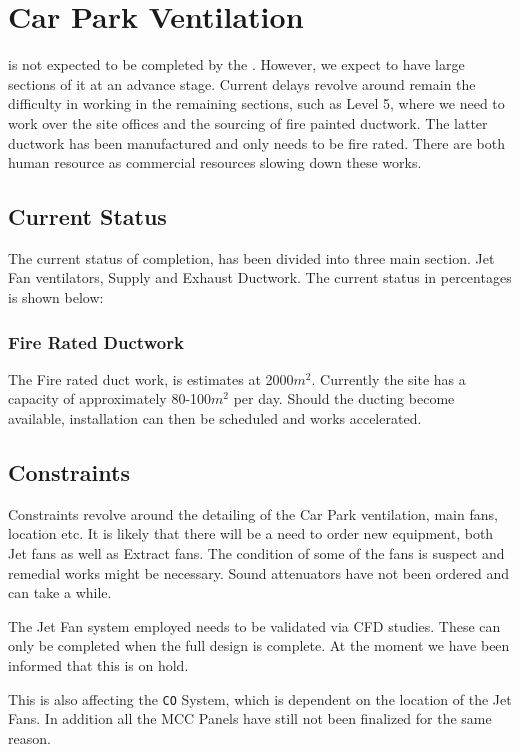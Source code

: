 \chapter{Car Park Ventilation}

 is not expected to be completed by the \deadline. However, we expect to have large sections of it at an advance stage. Current delays revolve around remain the difficulty in working in the remaining sections, such as Level 5, where we need to work over the site offices and 
the sourcing of fire painted ductwork. The latter ductwork has been manufactured and only needs to be
fire rated. There are both human resource as commercial resources slowing down these works.

\section{Current Status}

The current status of completion, has been divided into three main section. Jet Fan ventilators, Supply and Exhaust Ductwork. The current status in percentages is shown below:

\subsection{Fire Rated Ductwork}

The Fire rated duct work, is estimates at 2000$m^2$. Currently the site has a capacity of approximately 80-100$m^2$ per day. Should the ducting become available, installation can then be scheduled and works accelerated.




\section{Constraints}
Constraints revolve around the detailing of the Car Park ventilation,  main fans, location etc. It is likely that there will be a need to order new equipment, both Jet fans as well as Extract fans. The condition of some of the fans is suspect and remedial works might be necessary. Sound attenuators have not been ordered and can take a while.

The Jet Fan system employed needs to be validated via CFD studies. These can only be completed when the full design is complete. At the moment we have been informed that this is on hold.

This is also affecting the \texttt{CO} System, which is dependent on the location of the Jet Fans. In addition all the MCC Panels have still not been finalized for the same reason.

